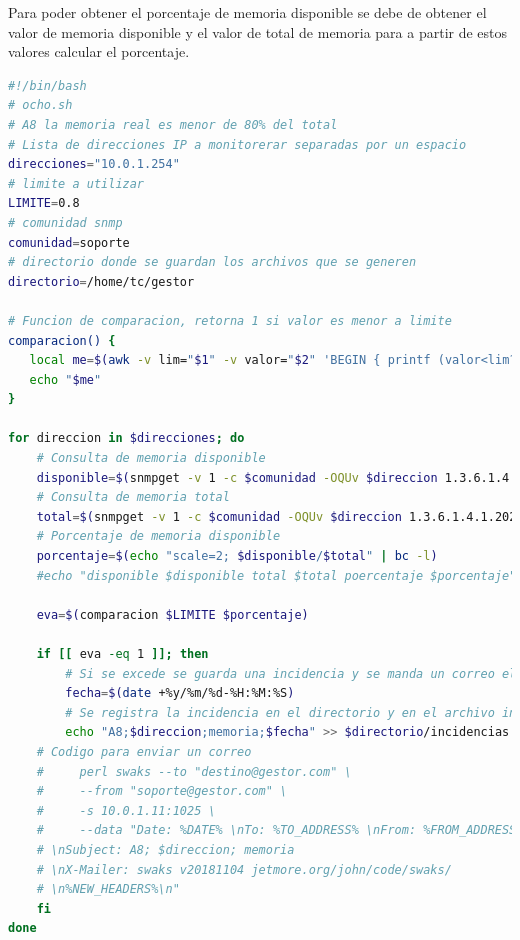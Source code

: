 \documentclass[12pt, titlepage]{article}
\begin{document}
Para poder obtener el porcentaje de memoria disponible se debe de obtener el valor de memoria disponible y el valor de total de memoria para a partir de estos valores calcular el porcentaje.
\begin{lstlisting}[language=bash]
 #!/bin/bash
# ocho.sh
# A8 la memoria real es menor de 80% del total
# Lista de direcciones IP a monitorerar separadas por un espacio
direcciones="10.0.1.254"
# limite a utilizar
LIMITE=0.8
# comunidad snmp
comunidad=soporte
# directorio donde se guardan los archivos que se generen
directorio=/home/tc/gestor

# Funcion de comparacion, retorna 1 si valor es menor a limite
comparacion() {
   local me=$(awk -v lim="$1" -v valor="$2" 'BEGIN { printf (valor<lim?1:0) }')
   echo "$me"
}

for direccion in $direcciones; do
    # Consulta de memoria disponible
    disponible=$(snmpget -v 1 -c $comunidad -OQUv $direccion 1.3.6.1.4.1.2021.4.6.0)
    # Consulta de memoria total
    total=$(snmpget -v 1 -c $comunidad -OQUv $direccion 1.3.6.1.4.1.2021.4.5.0)
    # Porcentaje de memoria disponible
    porcentaje=$(echo "scale=2; $disponible/$total" | bc -l)
    #echo "disponible $disponible total $total poercentaje $porcentaje"

    eva=$(comparacion $LIMITE $porcentaje)

    if [[ eva -eq 1 ]]; then
        # Si se excede se guarda una incidencia y se manda un correo electronico
        fecha=$(date +%y/%m/%d-%H:%M:%S)
        # Se registra la incidencia en el directorio y en el archivo incidencias
        echo "A8;$direccion;memoria;$fecha" >> $directorio/incidencias.log
    # Codigo para enviar un correo
    #     perl swaks --to "destino@gestor.com" \
    #     --from "soporte@gestor.com" \
    #     -s 10.0.1.11:1025 \
    #     --data "Date: %DATE% \nTo: %TO_ADDRESS% \nFrom: %FROM_ADDRESS% 
    # \nSubject: A8; $direccion; memoria 
    # \nX-Mailer: swaks v20181104 jetmore.org/john/code/swaks/
    # \n%NEW_HEADERS%\n"
    fi
done

\end{lstlisting}
\end{document}
